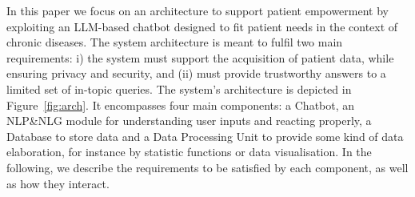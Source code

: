 In this paper we focus on %
an architecture to support patient empowerment by exploiting an LLM-based chatbot designed to fit patient needs in the context of chronic diseases.
%
The system architecture is meant to fulfil two main requirements: 
%
i) the system must support the acquisition of patient data, while ensuring privacy and security, and 
(ii) must provide trustworthy answers to a limited set of in-topic queries.
%
The system's architecture is depicted in Figure~\ref{fig:arch}. 
 It encompasses four main components: a Chatbot, an NLP\&NLG module for understanding user inputs and reacting properly, a Database to store data and 
 a Data Processing Unit to provide some kind of data elaboration, for instance by statistic functions or data visualisation.
%
In the following, we describe the requirements to be satisfied by each component, as well as how they interact.


